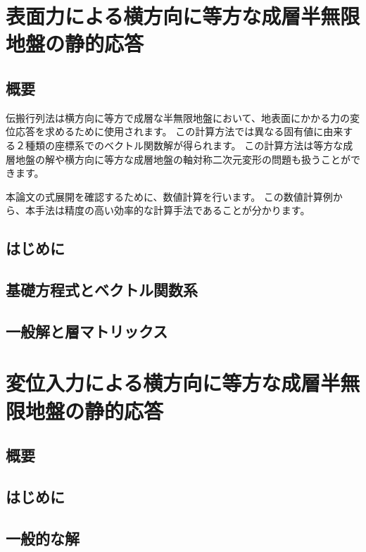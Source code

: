 \section{表面力による横方向に等方な成層半無限地盤の静的応答}

\subsection{概要}

伝搬行列法は横方向に等方で成層な半無限地盤において、地表面にかかる力の変位応答を求めるために使用されます。
この計算方法では異なる固有値に由来する２種類の座標系でのベクトル関数解が得られます。
この計算方法は等方な成層地盤の解や横方向に等方な成層地盤の軸対称二次元変形の問題も扱うことができます。

本論文の式展開を確認するために、数値計算を行います。
この数値計算例から、本手法は精度の高い効率的な計算手法であることが分かります。

\subsection{はじめに}

\subsection{基礎方程式とベクトル関数系}

\subsection{一般解と層マトリックス}

\section{変位入力による横方向に等方な成層半無限地盤の静的応答}

\subsection{概要}

\subsection{はじめに}

\subsection{一般的な解}

